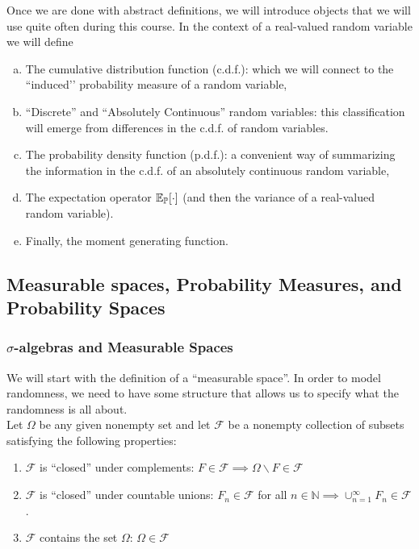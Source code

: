 \documentclass[11pt]{article} %
\begin{document}
Once we are done with abstract definitions, we will introduce objects that we will use quite often during this course. In the context of a real-valued random variable we will define

\begin{enumerate}[a)]
\item The cumulative distribution function (c.d.f.): which we will connect to the ``induced’’ probability measure of a random variable, 
\item ``Discrete'' and ``Absolutely Continuous'' random variables: this classification will emerge from differences in the c.d.f. of random variables. 

\item The probability density function (p.d.f.): a convenient way of summarizing the information in the c.d.f. of an absolutely continuous random variable, 

\item The expectation operator $\mathbb{E}_{\mathbb{P}}[\cdot]$ (and then the variance of a real-valued random variable). 

\item Finally, the moment generating function. 

\end{enumerate}

\subsection{Measurable spaces, Probability Measures, and Probability Spaces} 


\subsubsection{$\sigma$-algebras and Measurable Spaces}
We will start with the definition of a ``measurable space''. In order to model randomness, we need to have some structure that allows us to specify what the randomness is all about. \\

Let $\Omega$ be any given nonempty set and let $\mathcal{F}$ be a nonempty collection of subsets satisfying the following properties:
\begin{enumerate}
	\item $\mathcal{F}$ is ``closed'' under complements: $F \in \mathcal{F} \implies \Omega \backslash F \in \mathcal{F}$
	\item $\mathcal{F}$ is ``closed'' under countable unions: $F_{n} \in \mathcal{F}$ for all $n \in \mathbb{N} \implies \cup_{n=1}^{\infty} F_n \in \mathcal{F}$.
  \item $\mathcal{F}$ contains the set $\Omega$: $\Omega \in \mathcal{F}$
\end{enumerate}
\end{document}

